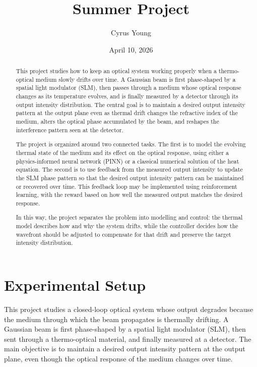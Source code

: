 \documentclass[11pt,letterpaper]{article}
\begin{document}
\title{Summer Project}
\author{Cyrus Young}
\date{April 10, 2026}


\maketitle

\begin{abstract}
This project studies how to keep an optical system working properly when a thermo-optical
medium slowly drifts over time. A Gaussian beam is first phase-shaped by a spatial light
modulator (SLM), then passes through a medium whose optical response changes as its
temperature evolves, and is finally measured by a detector through its output intensity
distribution. The central goal is to maintain a desired output intensity pattern at the output
plane even as thermal drift changes the refractive index of the medium, alters the optical phase
accumulated by the beam, and reshapes the interference pattern seen at the detector.

The project is organized around two connected tasks. The first is to model the evolving thermal
state of the medium and its effect on the optical response, using either a physics-informed
neural network (PINN) or a classical numerical solution of the heat equation. The second is to
use feedback from the measured output intensity to update the SLM phase pattern so that the
desired output intensity pattern can be maintained or recovered over time. This feedback loop
may be implemented using reinforcement learning, with the reward based on how well the measured
output matches the desired response.

In this way, the project separates the problem into modelling and control: the thermal model
describes how and why the system drifts, while the controller decides how the wavefront should
be adjusted to compensate for that drift and preserve the target intensity distribution.
\end{abstract}

\newpage 

\tableofcontents

\newpage

\section{Experimental Setup}

This project studies a closed-loop optical system whose output degrades because the medium through
which the beam propagates is thermally drifting. A Gaussian beam is first phase-shaped by a spatial
light modulator (SLM), then sent through a thermo-optical material, and finally measured at a
detector. The main objective is to maintain a desired output intensity pattern at the output plane,
even though the optical response of the medium changes over time.
\end{document}
